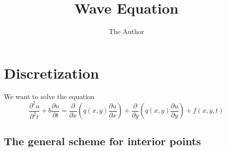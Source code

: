 \documentclass[11pt]{article} %
\title{Wave Equation}
\author{The Author}
\newcommand{\dutt}{\frac{\partial^2u}{\partial^2t}}
\newcommand{\dut}{\frac{\partial u}{\partial t}}
\newcommand{\dux}{\frac{\partial u}{\partial x}}
\newcommand{\duy}{\frac{\partial u}{\partial y}}
\newcommand{\dx}{\frac{\partial}{\partial x}}
\newcommand{\dy}{\frac{\partial}{\partial y}}
\begin{document}
\maketitle

\section{Discretization}
We want to solve the equation
\begin{equation}
\dutt + b\dut = \dx\left(q(x,y) \dux\right) + \dy\left(q(x,y) \duy\right) + f(x,y,t)
\label{wave_eq}
\end{equation}

\subsection{The general scheme for interior points}
\end{document}
